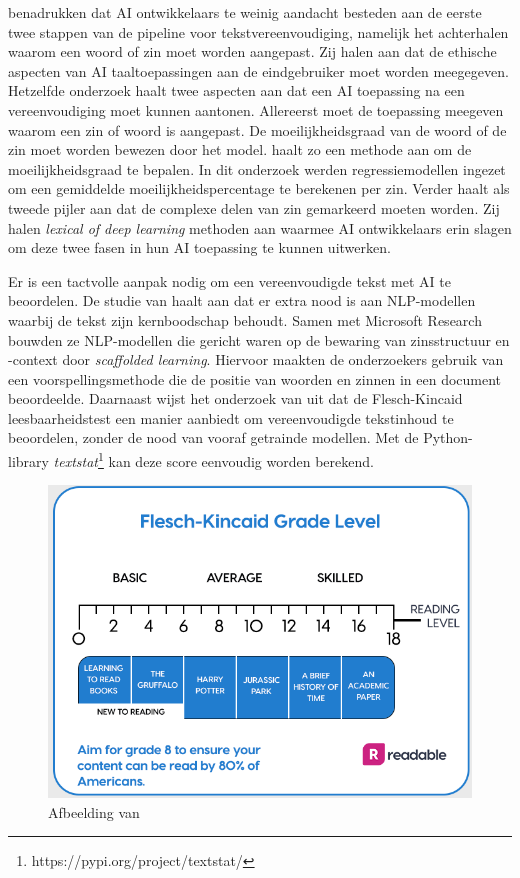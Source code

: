 \textcite{Garbacea2021} benadrukken dat AI ontwikkelaars te weinig aandacht besteden aan de eerste twee stappen van de pipeline voor tekstvereenvoudiging, namelijk het achterhalen waarom een woord of zin moet worden aangepast. Zij halen aan dat de ethische aspecten van AI taaltoepassingen aan de eindgebruiker moet worden meegegeven. Hetzelfde onderzoek haalt twee aspecten aan dat een AI toepassing na een vereenvoudiging moet kunnen aantonen. Allereerst moet de toepassing meegeven waarom een zin of woord is aangepast. De moeilijkheidsgraad van de woord of de zin moet worden bewezen door het model. \textcite{Iavarone2021} haalt zo een methode aan om de moeilijkheidsgraad te bepalen. In dit onderzoek werden regressiemodellen ingezet om een gemiddelde moeilijkheidspercentage te berekenen per zin. Verder haalt \textcite{Garbacea2021} als tweede pijler aan dat de complexe delen van zin gemarkeerd moeten worden. Zij halen \textit{lexical of deep learning} methoden aan waarmee AI ontwikkelaars erin slagen om deze twee fasen in hun AI toepassing te kunnen uitwerken.

Er is een tactvolle aanpak nodig om een vereenvoudigde tekst met AI te beoordelen. De studie van \textcite{Swayamdipta2019} haalt aan dat er extra nood is aan NLP-modellen waarbij de tekst zijn kernboodschap behoudt. Samen met Microsoft Research bouwden ze NLP-modellen die gericht waren op de bewaring van zinsstructuur en -context door \emph{scaffolded learning}. Hiervoor maakten de onderzoekers gebruik van een voorspellingsmethode die de positie van woorden en zinnen in een document beoordeelde. Daarnaast wijst het onderzoek van \textcite{Readable2021} uit dat de Flesch-Kincaid leesbaarheidstest een manier aanbiedt om vereenvoudigde tekstinhoud te beoordelen, zonder de nood van vooraf getrainde modellen. Met de Python-library \textit{textstat}\footnote{https://pypi.org/project/textstat/} kan deze score eenvoudig worden berekend.

\begin{figure}
	\includegraphics[width=\linewidth]{img/Screenshot_302.png}
	\caption{Afbeelding van \autocite{Readable2021}}
\end{figure}

